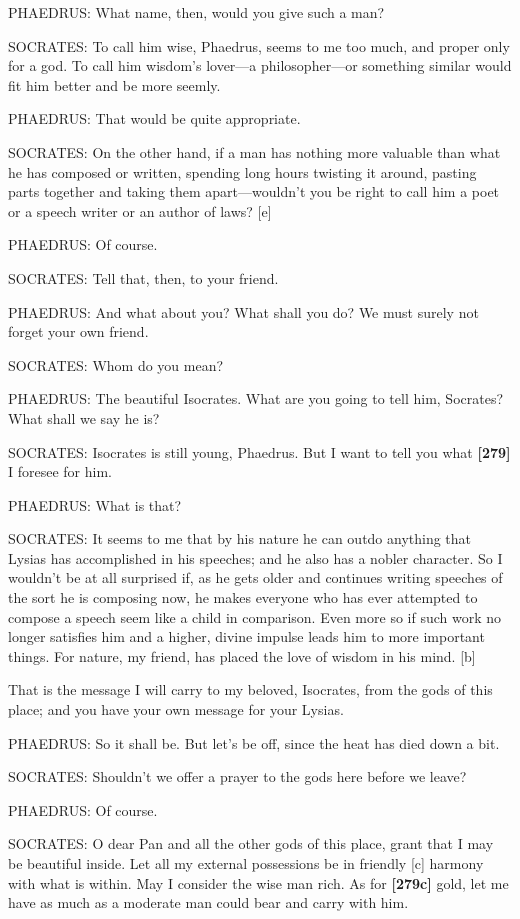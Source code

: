 PHAEDRUS: What name, then, would you give such a man?

SOCRATES: To call him wise, Phaedrus, seems to me too much, and proper
only for a god. To call him wisdom's lover---a philosopher---or
something similar would fit him better and be more seemly.

PHAEDRUS: That would be quite appropriate.

SOCRATES: On the other hand, if a man has nothing more valuable than
what he has composed or written, spending long hours twisting it around,
pasting parts together and taking them apart---wouldn't you be right to
call him a poet or a speech writer or an author of laws? {[}e{]}

PHAEDRUS: Of course.

SOCRATES: Tell that, then, to your friend.

PHAEDRUS: And what about you? What shall you do? We must surely not
forget your own friend.

SOCRATES: Whom do you mean?

PHAEDRUS: The beautiful
Isocrates. What are
you going to tell him, Socrates? What shall we say he is?

SOCRATES: Isocrates is still young, Phaedrus. But I want to tell you
what {\bf {[}279{]}} I foresee for him.

PHAEDRUS: What is that?

SOCRATES: It seems to me that by his nature he can outdo anything that
Lysias has accomplished in his speeches; and he also has a nobler
character. So I wouldn't be at all surprised if, as he gets older and
continues writing speeches of the sort he is composing now, he makes
everyone who has ever attempted to compose a speech seem like a child in
comparison. Even more so if such work no longer satisfies him and a
higher, divine impulse leads him to more important things. For nature,
my friend, has placed the love of wisdom in his mind. {[}b{]}

That is the message I will carry to my beloved, Isocrates, from the gods
of this place; and you have your own message for your Lysias.

PHAEDRUS: So it shall be. But let's be off, since the heat has died down
a bit.

SOCRATES: Shouldn't we offer a prayer to the gods here before we leave?

PHAEDRUS: Of course.

SOCRATES: O dear Pan and all the other gods of this place, grant that I
may be beautiful inside. Let all my external possessions be in friendly
{[}c{]} harmony with what is within. May I consider the wise man rich.
As for {\bf {[}279c{]}} gold, let me have as much as a moderate man
could bear and carry with him.

